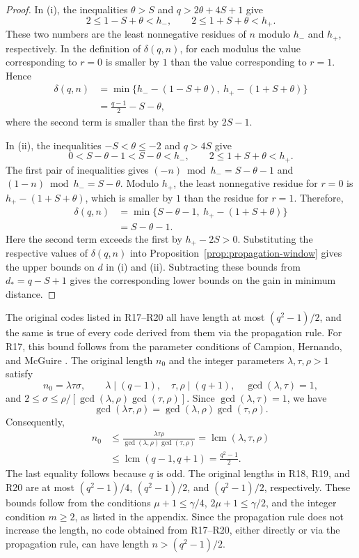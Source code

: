 \documentclass[preprint,12pt,a4paper]{elsarticle}
\begin{document}
\begin{proof}
In \textup{(i)}, the inequalities $\theta>S$ and $q>2\theta+4S+1$ give
\[
 2\le1-S+\theta<h_-,\qquad
 2\le1+S+\theta<h_+.
\]
These two numbers are the least nonnegative residues of $n$ modulo $h_-$ and $h_+$, respectively. In the definition of $\delta(q,n)$, for each modulus the value corresponding to $r=0$ is smaller by $1$ than the value corresponding to $r=1$. Hence
\[
 \begin{aligned}
 \delta(q,n)
 &=\min\{h_--(1-S+\theta),\ h_+-(1+S+\theta)\}\\
 &=\frac{q-1}{2}-S-\theta,
 \end{aligned}
\]
where the second term is smaller than the first by $2S-1$.

In \textup{(ii)}, the inequalities $-S<\theta\le-2$ and $q>4S$ give
\[
 0<S-\theta-1<S-\theta<h_-,
 \qquad 2\le1+S+\theta<h_+.
\]
The first pair of inequalities gives $(-n)\bmod h_-=S-\theta-1$ and $(1-n)\bmod h_-=S-\theta$. Modulo $h_+$, the least nonnegative residue for $r=0$ is $h_+-(1+S+\theta)$, which is smaller by $1$ than the residue for $r=1$. Therefore,
\[
 \begin{aligned}
 \delta(q,n)
 &=\min\{S-\theta-1,\ h_+-(1+S+\theta)\}\\
 &=S-\theta-1.
 \end{aligned}
\]
Here the second term exceeds the first by $h_+-2S>0$. Substituting the respective values of $\delta(q,n)$ into Proposition~\ref{prop:propagation-window} gives the upper bounds on $d$ in \textup{(i)} and \textup{(ii)}. Subtracting these bounds from $d_*=q-S+1$ gives the corresponding lower bounds on the gain in minimum distance.
\end{proof}

The original codes listed in R17--R20 all have length at most $(q^2-1)/2$, and the same is true of every code derived from them via the propagation rule. For R17, this bound follows from the parameter conditions of Campion, Hernando, and McGuire \cite[Theorem~1.1]{CampionHernandoMcGuire2025}. The original length $n_0$ and the integer parameters $\lambda,\tau,\rho>1$ satisfy
\[
 n_0=\lambda\tau\sigma,\qquad
 \lambda\mid(q-1),\quad\tau,\rho\mid(q+1),\quad
 \gcd(\lambda,\tau)=1,
\]
and $2\le\sigma\le\rho/[\gcd(\lambda,\rho)\gcd(\tau,\rho)]$. Since $\gcd(\lambda,\tau)=1$, we have
\[
 \gcd(\lambda\tau,\rho)
 =\gcd(\lambda,\rho)\gcd(\tau,\rho).
\]
Consequently,
\[
 \begin{aligned}
 n_0
 &\le\frac{\lambda\tau\rho}{\gcd(\lambda,\rho)\gcd(\tau,\rho)}
 =\operatorname{lcm}(\lambda,\tau,\rho)\\
 &\le\operatorname{lcm}(q-1,q+1)
 =\frac{q^2-1}{2}.
 \end{aligned}
\]
The last equality follows because $q$ is odd. The original lengths in R18, R19, and R20 are at most $(q^2-1)/4$, $(q^2-1)/2$, and $(q^2-1)/2$, respectively. These bounds follow from the conditions $\mu+1\le\gamma/4$, $2\mu+1\le\gamma/2$, and the integer condition $m\ge2$, as listed in the appendix. Since the propagation rule does not increase the length, no code obtained from R17--R20, either directly or via the propagation rule, can have length $n>(q^2-1)/2$.
\end{document}
